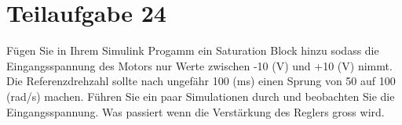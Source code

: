 \section{Teilaufgabe 24}
\begin{aufgabe}
    Fügen Sie in Ihrem Simulink Progamm ein Saturation Block hinzu sodass die 
    Eingangsspannung des Motors nur Werte zwischen -10 (V) und +10 (V) nimmt. 
    Die Referenzdrehzahl sollte nach ungefähr 100 (ms) einen Sprung von 50 auf 
    100 (rad/s) machen. Führen Sie ein paar Simulationen durch und beobachten 
    Sie die Eingangsspannung. Was passiert wenn die Verstärkung des Reglers 
    gross wird.
\end{aufgabe}
